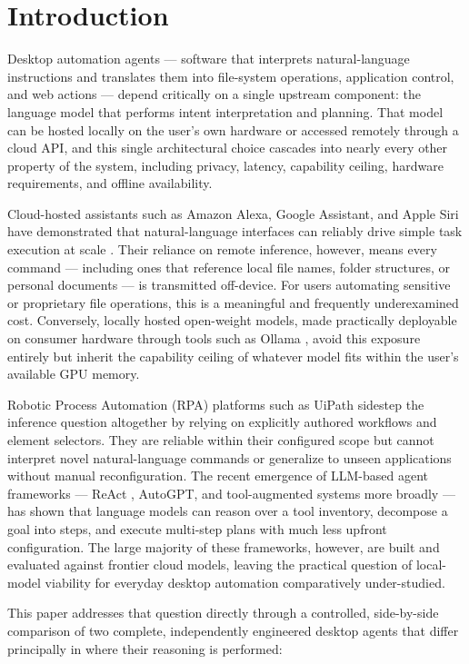 \documentclass[conference]{IEEEtran}
\begin{document}
\section{Introduction}

Desktop automation agents --- software that interprets natural-language instructions and translates them into file-system operations, application control, and web actions --- depend critically on a single upstream component: the language model that performs intent interpretation and planning. That model can be hosted locally on the user's own hardware or accessed remotely through a cloud API, and this single architectural choice cascades into nearly every other property of the system, including privacy, latency, capability ceiling, hardware requirements, and offline availability.

Cloud-hosted assistants such as Amazon Alexa, Google Assistant, and Apple Siri have demonstrated that natural-language interfaces can reliably drive simple task execution at scale \cite{ref1}. Their reliance on remote inference, however, means every command --- including ones that reference local file names, folder structures, or personal documents --- is transmitted off-device. For users automating sensitive or proprietary file operations, this is a meaningful and frequently underexamined cost. Conversely, locally hosted open-weight models, made practically deployable on consumer hardware through tools such as Ollama \cite{ref2}, avoid this exposure entirely but inherit the capability ceiling of whatever model fits within the user's available GPU memory.

Robotic Process Automation (RPA) platforms such as UiPath \cite{ref3} sidestep the inference question altogether by relying on explicitly authored workflows and element selectors. They are reliable within their configured scope but cannot interpret novel natural-language commands or generalize to unseen applications without manual reconfiguration. The recent emergence of LLM-based agent frameworks --- ReAct \cite{ref4}, AutoGPT, and tool-augmented systems more broadly \cite{ref5} --- has shown that language models can reason over a tool inventory, decompose a goal into steps, and execute multi-step plans with much less upfront configuration. The large majority of these frameworks, however, are built and evaluated against frontier cloud models, leaving the practical question of local-model viability for everyday desktop automation comparatively under-studied.

This paper addresses that question directly through a controlled, side-by-side comparison of two complete, independently engineered desktop agents that differ principally in where their reasoning is performed:
\end{document}
